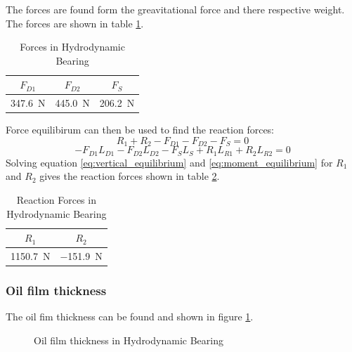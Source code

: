 The forces are found form the greavitational force and there respective weight. The forces are shown in table \ref{tab:hydrodynamic_bearing_forces}.
\begin{table}[htbp]
    \centering
    \caption{Forces in Hydrodynamic Bearing}
    \label{tab:hydrodynamic_bearing_forces}
    \begin{tabular}{@{}ccc@{}}
        \toprule
        $F_{D1}$    &   $F_{D2}$    &   $F_S$   \\ \midrule
        \SI{347.6}{\newton}  &   \SI{445.0}{\newton}  &   \SI{206.2}{\newton}   \\ \bottomrule
    \end{tabular}
\end{table}

Force equilibirum can then be used to find the reaction forces:
\begin{equation}
    R_1 + R_2 - F_{D1} - F_{D2} - F_S = 0
    \label{eq:vertical_equilibrium}
\end{equation}
\begin{equation}
    -F_{D1} L_{D1} - F_{D2} L_{D2} - F_S L_S + R_1 L_{R1} + R_2 L_{R2} = 0
    \label{eq:moment_equilibrium}
\end{equation}
Solving equation \ref{eq:vertical_equilibrium} and \ref{eq:moment_equilibrium} for $R_1$ and $R_2$ gives the reaction forces shown in table \ref{tab:hydrodynamic_bearing_reactions}.
\begin{table}[htbp]
    \centering
    \caption{Reaction Forces in Hydrodynamic Bearing}
    \label{tab:hydrodynamic_bearing_reactions}
    \begin{tabular}{@{}cc@{}}
        \toprule
        $R_1$    &   $R_2$    \\ \midrule
        \SI{1150.7}{\newton}  &   \SI{-151.9}{\newton}  \\ \bottomrule
    \end{tabular}
\end{table}

\subsubsection{Oil film thickness}
The oil fim thickness can be found and shown in figure \ref{fig:oil_film_thickness}.
\begin{figure}[htbp]
    \centering
    
    \caption{Oil film thickness in Hydrodynamic Bearing}
    \label{fig:oil_film_thickness}
\end{figure}

